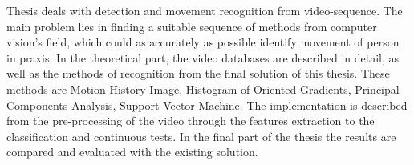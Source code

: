 Thesis deals with detection and movement recognition from video-sequence.
The main problem lies in finding a suitable sequence of methods from computer vision's field, which could as accurately as possible identify movement of person in praxis.
In the theoretical part, the video databases are described in detail, as well as the methods of recognition from the final solution of this thesis. These methods are Motion History Image, Histogram of Oriented Gradients, Principal Components Analysis, Support Vector Machine.
The implementation is described from the pre-processing of the video through the features extraction to the classification and continuous tests. In the final part of the thesis the results are compared and evaluated with the existing solution.